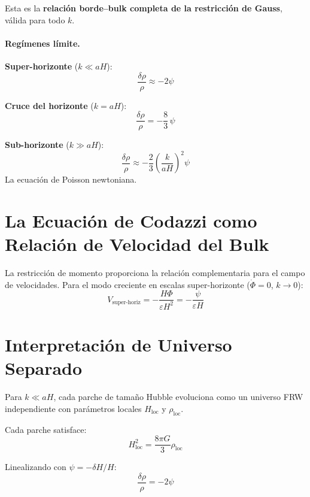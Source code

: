 \documentclass[12pt,a4paper]{article}
\begin{document}
Esta es la \textbf{relación borde--bulk completa de la restricción de Gauss}, válida para todo $k$.

\paragraph{Regímenes límite.}

\textbf{Super-horizonte} ($k \ll aH$):
\begin{equation}
\frac{\delta\rho}{\rho} \approx -2\psi \tag{18}
\end{equation}

\textbf{Cruce del horizonte} ($k = aH$):
\begin{equation}
\frac{\delta\rho}{\rho} = -\frac{8}{3}\,\psi \tag{19}
\end{equation}

\textbf{Sub-horizonte} ($k \gg aH$):
\begin{equation}
\frac{\delta\rho}{\rho} \approx -\frac{2}{3}\!\left(\frac{k}{aH}\right)^2\psi \tag{20}
\end{equation}
La ecuación de Poisson newtoniana.

\section{La Ecuación de Codazzi como Relación de Velocidad del Bulk}

La restricción de momento proporciona la relación complementaria para el campo de velocidades. Para el modo creciente en escalas super-horizonte ($\dot\Phi = 0$, $k \to 0$):
\begin{equation}
V_\text{super-horiz} = -\frac{H\Phi}{\varepsilon H^2} = -\frac{\psi}{\varepsilon H} \tag{21}
\end{equation}

\section{Interpretación de Universo Separado}

Para $k \ll aH$, cada parche de tamaño Hubble evoluciona como un universo FRW independiente con parámetros locales $H_\text{loc}$ y $\rho_\text{loc}$.

Cada parche satisface:
\begin{equation}
H_\text{loc}^2 = \frac{8\pi G}{3}\rho_\text{loc} \tag{22}
\end{equation}

Linealizando con $\psi = -\delta H/H$:
\begin{equation}
\frac{\delta\rho}{\rho} = -2\psi \tag{23}
\end{equation}
\end{document}
